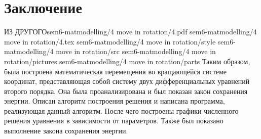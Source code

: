 \section{Заключение}
    ИЗ ДРУГОГОsem6-matmodelling/4 move in rotation/4.pdf sem6-matmodelling/4 move in rotation/4.tex sem6-matmodelling/4 move in rotation/style sem6-matmodelling/4 move in rotation/src sem6-matmodelling/4 move in rotation/pictures sem6-matmodelling/4 move in rotation/parts
    Таким образом, была построена математическая перемещения во вращающейся системе координат, представляющая собой систему двух дифференциальных уравнений второго порядка. Она была проанализирована и был показан закон сохранения энергии. Описан алгоритм построения решения и написана программа, реализующая данный алгоритм. После чего построены графики численного решения уравнения в зависимости от параметров. Также был показано выполнение закона сохранения энергии.
